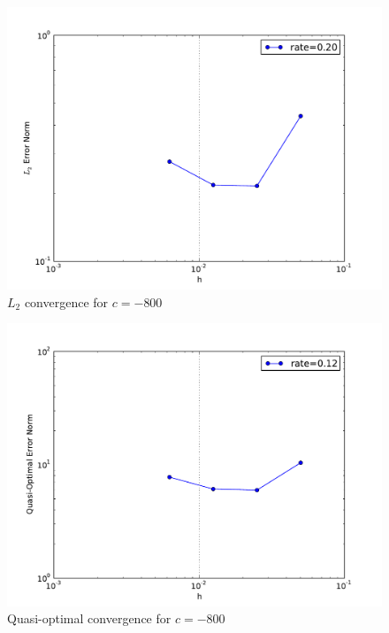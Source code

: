 \documentclass[10pt,letterpaper]{article}
\begin{document}
\begin{figure}[p]
\begin{center}
\includegraphics[width=5in]{ec-800.pdf}
\end{center}
\caption{$L_2$ convergence for $c=-800$}
\end{figure}

\begin{figure}[p]
\begin{center}
\includegraphics[width=5in]{epc-800.pdf}
\end{center}
\caption{Quasi-optimal convergence for $c=-800$}
\end{figure}

\clearpage
\newpage

\end{document}
